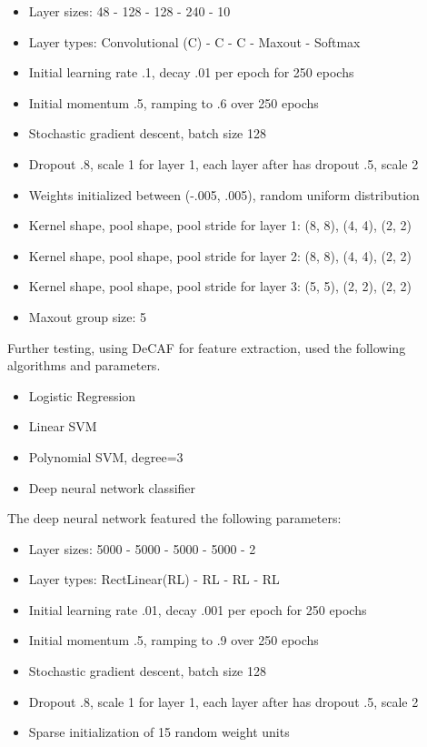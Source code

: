 \documentclass[journal]{IEEEtran}
\begin{document}
\begin{itemize}
\item Layer sizes: 48 - 128 - 128 - 240 - 10
\item Layer types: Convolutional (C) - C - C - Maxout - Softmax
\item Initial learning rate .1, decay .01 per epoch for 250 epochs
\item Initial momentum .5, ramping to .6 over 250 epochs
\item Stochastic gradient descent, batch size 128 
\item Dropout .8, scale 1 for layer 1, each layer after has dropout .5, scale 2
\item Weights initialized between (-.005, .005), random uniform distribution
\item Kernel shape, pool shape, pool stride for layer 1: (8, 8), (4, 4), (2, 2) 
\item Kernel shape, pool shape, pool stride for layer 2: (8, 8), (4, 4), (2, 2) 
\item Kernel shape, pool shape, pool stride for layer 3: (5, 5), (2, 2), (2, 2) 
\item Maxout group size: 5 
\end{itemize}

Further testing, using DeCAF for feature extraction, used the following 
algorithms and parameters.

\begin{itemize}
\item Logistic Regression 
\item Linear SVM 
\item Polynomial SVM, degree=3 
\item Deep neural network classifier 
\end{itemize}

The deep neural network featured the following parameters:
\begin{itemize}
\item Layer sizes: 5000 - 5000 - 5000 - 5000 - 2
\item Layer types: RectLinear(RL) - RL - RL - RL
\item Initial learning rate .01, decay .001 per epoch for 250 epochs
\item Initial momentum .5, ramping to .9 over 250 epochs
\item Stochastic gradient descent, batch size 128 
\item Dropout .8, scale 1 for layer 1, each layer after has dropout .5, scale 2
\item Sparse initialization of 15 random weight units 
\end{itemize}
\end{document}
